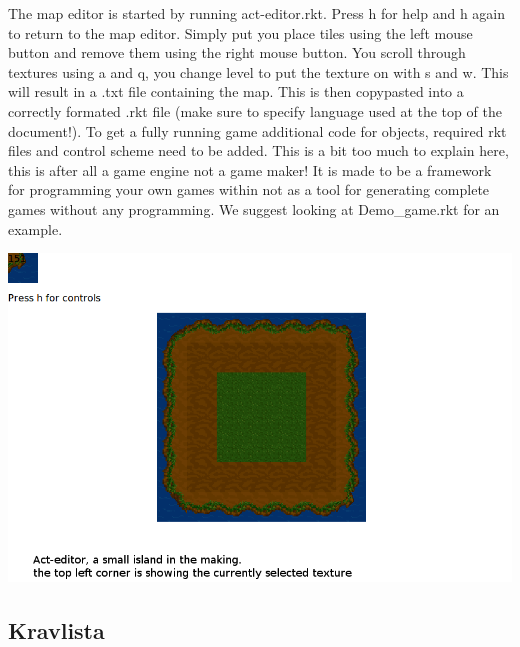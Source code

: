 \documentclass[12pt,a4paper]{article}
\begin{document}
The map editor is started by running act-editor.rkt. Press h for help and h again to return to the map editor.
Simply put you place tiles using the left mouse button and remove them using the right mouse button.
You scroll through textures using a and q, you change level to put the texture on with s and w.
This will result in a .txt file containing the map. This is then copypasted into a correctly formated .rkt file (make sure to specify language used at the top of the document!). To get a fully running game additional code for objects, required rkt files and control scheme need to be added.
This is a bit too much to explain here, this is after all a game engine not a game maker!
It is made to be a framework for programming your own games within not as a tool for generating complete games without any programming.
We suggest looking at Demo\_game.rkt for an example.


\includegraphics[scale=0.25]{act-editor-example}


\subsection{Kravlista}
\end{document}
